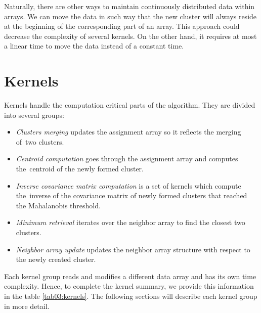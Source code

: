 \begin{rem}
	Naturally, there are other ways to maintain continuously distributed data within arrays. We can move the data in such way that the new cluster will always reside at the beginning of the corresponding part of an array. This approach could decrease the complexity of several kernels. On the other hand, it requires at most a linear time to move the data instead of a constant time.
\end{rem}

\section{Kernels}

Kernels handle the computation critical parts of the algorithm. They are divided into several groups:

\begin{itemize}
	\item \emph{Clusters merging} updates the assignment array so it reflects the merging of~two clusters.
	\item \emph{Centroid computation} goes through the assignment array and computes the~centroid of the newly formed cluster. 
	\item \emph{Inverse covariance matrix computation} is a set of kernels which compute the~inverse of the covariance matrix of newly formed clusters that reached the Mahalanobis threshold. 
	\item \emph{Minimum retrieval} iterates over the neighbor array to find the closest two clusters.
	\item \emph{Neighbor array update} updates the neighbor array structure with respect to the newly created cluster.
\end{itemize}

Each kernel group reads and modifies a different data array and has its own time complexity. Hence, to complete the kernel summary, we provide this information in the table \ref{tab03:kernels}. The following sections will describe each kernel group in more detail.


